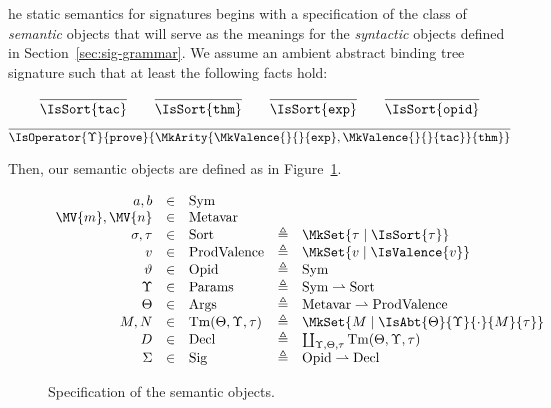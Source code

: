 \newcommand\SemSym{\mathrm{Sym}}
\newcommand\SemMetavar{\mathrm{Metavar}}
\newcommand\SemOpid{\mathrm{Opid}}
\newcommand\SemSig{\mathrm{Sig}}
\newcommand\SemParams{\mathrm{Params}}
\newcommand\SemArgs{\mathrm{Args}}
\newcommand\SemTerm[3]{\mathrm{Tm}(#1,#2,#3)}
\newcommand\SemSort{\mathrm{Sort}}
\newcommand\SemProdValence{\mathrm{ProdValence}}
\newcommand\SemDecl{\mathrm{Decl}}
\newcommand\Partial[2]{#1\rightharpoonup #2}

\newcommand\SemExprs{\mathbf{E}}
\newcommand\AbtSortTac{\mathtt{tac}}
\newcommand\AbtSortThm{\mathtt{thm}}
\newcommand\AbtSortExp{\mathtt{exp}}
\newcommand\AbtSortOpid{\mathtt{opid}}
\newcommand\OpProve{\mathtt{prove}}

\newcommand\OpCust

The static semantics for \RedJonPRL{} signatures begins with a specification of
the class of \emph{semantic} objects that will serve as the meanings for the
\emph{syntactic} objects defined in Section~\ref{sec:sig-grammar}. We assume an
ambient abstract binding tree signature such that at least the following facts
hold:

\[
  \infer{
    \IsSort{\AbtSortTac}
  }{
  }
  \qquad
  \infer{
    \IsSort{\AbtSortThm}
  }{
  }
  \qquad
  \infer{
    \IsSort{\AbtSortExp}
  }{
  }
  \qquad
  \infer{
    \IsSort{\AbtSortOpid}
  }{
  }
\]
\[
  \infer{
    \IsOperator{\Upsilon}{\OpProve}{
      \MkArity{
        \MkValence{}{}{\AbtSortExp},
        \MkValence{}{}{\AbtSortTac}
      }{\AbtSortThm}
    }
  }{
  }
\]

Then, our semantic objects are defined as in Figure~\ref{fig:sig-semantic-objects}.

\begin{figure}[H]
  \begin{displaymath}
    \begin{array}{rclcl}
      a,b &\in &\SemSym\\
      \MV{m},\MV{n} &\in &\SemMetavar\\
      \sigma,\tau &\in &\SemSort &\triangleq & \MkSet{\tau\mid\IsSort{\tau}}\\
      v &\in &\SemProdValence &\triangleq & \MkSet{v\mid\IsValence{v}}\\
      \vartheta &\in &\SemOpid  &\triangleq &\SemSym\\
      \Upsilon &\in &\SemParams &\triangleq & \Partial{\SemSym}{\SemSort}\\
      \Theta &\in &\SemArgs &\triangleq & \Partial{\SemMetavar}{\SemProdValence}\\
      M,N &\in &\SemTerm{\Theta}{\Upsilon}{\tau} &\triangleq & \MkSet{M\mid\IsAbt{\Theta}{\Upsilon}{\cdot}{M}{\tau}}\\
      D &\in &\SemDecl &\triangleq & \coprod_{\Upsilon,\Theta,\tau} \SemTerm{\Theta}{\Upsilon}{\tau}\\
      \Sigma &\in &\SemSig &\triangleq & \Partial{\SemOpid}{\SemDecl}
    \end{array}
  \end{displaymath}
  \caption{Specification of the semantic objects.}
  \label{fig:sig-semantic-objects}
\end{figure}

